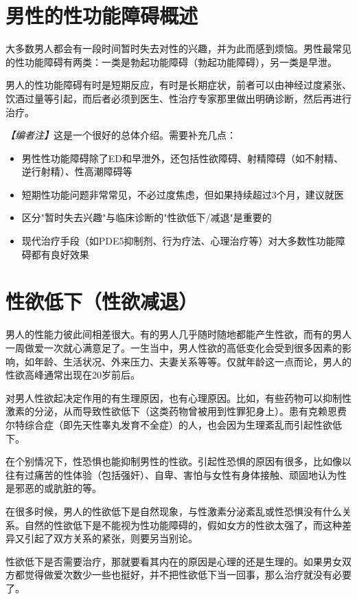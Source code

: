 \section{男性的性功能障碍概述}

大多数男人都会有一段时间暂时失去对性的兴趣，并为此而感到烦恼。男性最常见的性功能障碍有两类：一类是勃起功能障碍（勃起功能障碍），另一类是早泄。

男人的性功能障碍有时是短期反应，有时是长期症状，前者可以由神经过度紧张、饮酒过量等引起，而后者必须到医生、性治疗专家那里做出明确诊断，然后再进行治疗。

\noindent\textit{【编者注】}这是一个很好的总体介绍。需要补充几点：
\begin{itemize}
	\item 男性性功能障碍除了ED和早泄外，还包括性欲障碍、射精障碍（如不射精、逆行射精）、性高潮障碍等
	\item 短期性功能问题非常常见，不必过度焦虑，但如果持续超过3个月，建议就医
	\item 区分"暂时失去兴趣"与临床诊断的"性欲低下/减退"是重要的
	\item 现代治疗手段（如PDE5抑制剂、行为疗法、心理治疗等）对大多数性功能障碍都有良好效果
\end{itemize}

\section{性欲低下（性欲减退）}

男人的性能力彼此间相差很大。有的男人几乎随时随地都能产生性欲，而有的男人一周做爱一次就心满意足了。一生当中，男人性欲的高低变化会受到很多因素的影响，如年龄、生活状况、外来压力、夫妻关系等等。仅就年龄这一点而论，男人的性欲高峰通常出现在20岁前后。

对男人性欲起决定作用的有生理原因，也有心理原因。比如，有些药物可以抑制性激素的分泌，从而导致性欲低下（这类药物曾被用到性罪犯身上）。患有克赖恩费尔特综合症（即先天性睾丸发育不全症）的人，也会因为生理紊乱而引起性欲低下。

在个别情况下，性恐惧也能抑制男性的性欲。引起性恐惧的原因有很多，比如像以往有过痛苦的性体验（包括强奸）、自卑、害怕与女性有身体接触、顽固地认为性是邪恶的或肮脏的等。

在很多时候，男人的性欲低下是自然现象，与性激素分泌紊乱或性恐惧没有什么关系。自然的性欲低下是不能视为性功能障碍的，假如女方的性欲太强了，而这种差异又引起了双方关系的紧张，则要另当别论。

性欲低下是否需要治疗，那就要看其内在的原因是心理的还是生理的。如果男女双方都觉得做爱次数少一些也挺好，并不把性欲低下当一回事，那么治疗就没有必要了。

